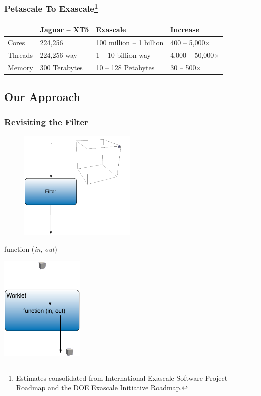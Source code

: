 \documentclass[brown]{beamer}
\begin{document}
\frame
{
  \frametitle{Petascale To Exascale\footnote[1]{Estimates consolidated from International
  Exascale Software Project Roadmap and the DOE Exascale Initiative Roadmap.}}
  \renewcommand{\arraystretch}{1.5}
  \begin{table}[htbp]
    \centering
    \begin{tabular}{l|l|l|l}
      & Jaguar -- XT5 & Exascale & Increase \\
      \hline
      Cores & 224,256
      & 100 million -- 1 billion
      & 400 -- 5,000$\times$ \\
      Threads & 224,256 way
      & 1 -- 10 billion way
      & 4,000 -- 50,000$\times$ \\
      Memory & 300 Terabytes
      & 10 -- 128  Petabytes
      & 30 -- 500$\times$
    \end{tabular}
  \end{table}
}

\subsection{Our Approach}
\frame
{
  \frametitle{Revisiting the Filter}
  \begin{figure}
  \centering
  \includegraphics[width=0.5\textwidth]{images/SingleElementFilter.pdf}
  \end{figure}
}

\frame
{
  \begin{center}
  function (\emph{in}, \emph{out})
  \end{center}
}

\frame
{
  \begin{center}
  \includegraphics[width=0.3\textwidth]{images/worklet.pdf}
  \end{center}
}
\end{document}
